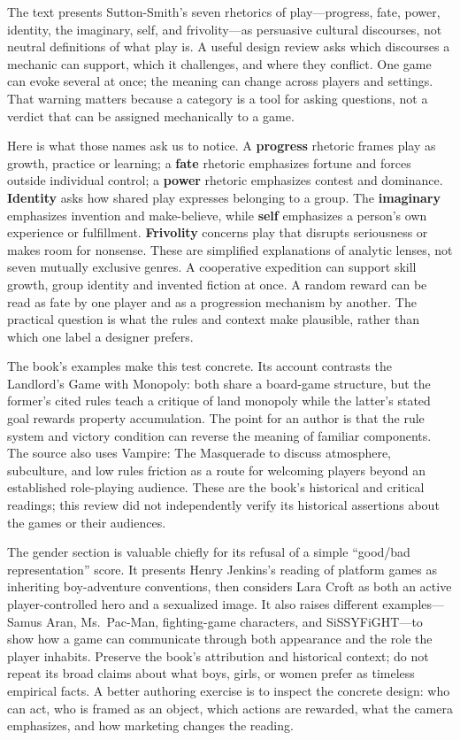 The text presents Sutton-Smith's seven rhetorics of play---progress, fate, power, identity, the imaginary, self, and frivolity---as persuasive cultural discourses, not neutral definitions of what play is. A useful design review asks which discourses a mechanic can support, which it challenges, and where they conflict. One game can evoke several at once; the meaning can change across players and settings. That warning matters because a category is a tool for asking questions, not a verdict that can be assigned mechanically to a game.

Here is what those names ask us to notice. A \textbf{progress} rhetoric frames play as growth, practice or learning; a \textbf{fate} rhetoric emphasizes fortune and forces outside individual control; a \textbf{power} rhetoric emphasizes contest and dominance. \textbf{Identity} asks how shared play expresses belonging to a group. The \textbf{imaginary} emphasizes invention and make-believe, while \textbf{self} emphasizes a person's own experience or fulfillment. \textbf{Frivolity} concerns play that disrupts seriousness or makes room for nonsense. These are simplified explanations of analytic lenses, not seven mutually exclusive genres. A cooperative expedition can support skill growth, group identity and invented fiction at once. A random reward can be read as fate by one player and as a progression mechanism by another. The practical question is what the rules and context make plausible, rather than which one label a designer prefers.

The book's examples make this test concrete. Its account contrasts the Landlord's Game with Monopoly: both share a board-game structure, but the former's cited rules teach a critique of land monopoly while the latter's stated goal rewards property accumulation. The point for an author is that the rule system and victory condition can reverse the meaning of familiar components. The source also uses Vampire: The Masquerade to discuss atmosphere, subculture, and low rules friction as a route for welcoming players beyond an established role-playing audience. These are the book's historical and critical readings; this review did not independently verify its historical assertions about the games or their audiences.

The gender section is valuable chiefly for its refusal of a simple ``good/bad representation'' score. It presents Henry Jenkins's reading of platform games as inheriting boy-adventure conventions, then considers Lara Croft as both an active player-controlled hero and a sexualized image. It also raises different examples---Samus Aran, Ms.~Pac-Man, fighting-game characters, and SiSSYFiGHT---to show how a game can communicate through both appearance and the role the player inhabits. Preserve the book's attribution and historical context; do not repeat its broad claims about what boys, girls, or women prefer as timeless empirical facts. A better authoring exercise is to inspect the concrete design: who can act, who is framed as an object, which actions are rewarded, what the camera emphasizes, and how marketing changes the reading.

